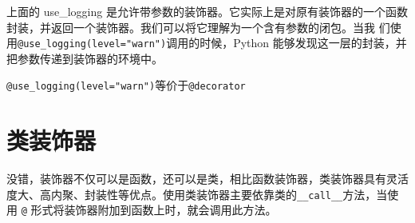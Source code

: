 \documentclass[]{ctexbook}
\newenvironment{Shaded}{\begin{snugshade}}{\end{snugshade}}
\newcommand{\AttributeTok}[1]{\textcolor[rgb]{0.77,0.63,0.00}{#1}}
\newcommand{\BuiltInTok}[1]{#1}
\newcommand{\ControlFlowTok}[1]{\textcolor[rgb]{0.13,0.29,0.53}{\textbf{#1}}}
\newcommand{\KeywordTok}[1]{\textcolor[rgb]{0.13,0.29,0.53}{\textbf{#1}}}
\newcommand{\NormalTok}[1]{#1}
\newcommand{\OperatorTok}[1]{\textcolor[rgb]{0.81,0.36,0.00}{\textbf{#1}}}
\newcommand{\SpecialCharTok}[1]{\textcolor[rgb]{0.00,0.00,0.00}{#1}}
\newcommand{\StringTok}[1]{\textcolor[rgb]{0.31,0.60,0.02}{#1}}
\newcommand{\VariableTok}[1]{\textcolor[rgb]{0.00,0.00,0.00}{#1}}
\begin{document}
\begin{Shaded}
\end{Shaded}

上面的 use\_logging 是允许带参数的装饰器。它实际上是对原有装饰器的一个函数封装，并返回一个装饰器。我们可以将它理解为一个含有参数的闭包。当我 们使用\texttt{@use\_logging(level="warn")}调用的时候，Python 能够发现这一层的封装，并把参数传递到装饰器的环境中。

\texttt{@use\_logging(level="warn")}等价于\texttt{@decorator}

\hypertarget{ux7c7bux88c5ux9970ux5668}{%
\section{类装饰器}\label{ux7c7bux88c5ux9970ux5668}}

没错，装饰器不仅可以是函数，还可以是类，相比函数装饰器，类装饰器具有灵活度大、高内聚、封装性等优点。使用类装饰器主要依靠类的\texttt{\_\_call\_\_}方法，当使用 \texttt{@} 形式将装饰器附加到函数上时，就会调用此方法。
\end{document}
